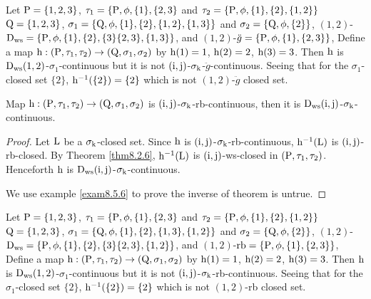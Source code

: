 \begin{exm}\label{exam8.5.5}
Let $\mathrm{P}=\{1,2,3\}$, $\tau_1 =\{\mathrm{P}, \phi, \{1\},\{2,3\}$ and $\tau_2 =\{\TSP, \phi, \{1\},\{2\},\break \{1,2\}\}$ $\mathrm{Q}=\{1,2,3\}$, $\sigma_{1} =\{\mathrm{Q},\phi,\{1\},\{2\},\{1,2\},\{1,3\}\}$ and $\sigma_{2} =\{\mathrm{Q},\phi, \{2\}\}$, $(1,2)$-$\mathrm{D}_{\mathrm{ws}} =\{\mathrm{P}, \phi, \{1\},\{2\},\{3\}\{2,3\},\{1,3\}\}$, and $(1,2)$-$\ddot{g} =\{\mathrm{P}, \phi, \{1\},\{2,3\}\}$, Define a map $\mathrm{h}: (\mathrm{P}, \tau_1, \tau_2 )\to (\mathrm{Q}, \sigma_{1}, \sigma_{2} )$ by $\mathrm{h}(1)=1$, $\mathrm{h}(2)=2$, $\mathrm{h}(3)=3$. Then $\mathrm{h}$ is $\mathrm{D}_{\mathrm{ws}} (1, 2)$-$\sigma_{1}$-continuous but it is not $(\mathrm{i}, \mathrm{j})$-$\sigma_{\mathrm{k}}$-$\ddot{g}$-continuous. Seeing that for the $\sigma_{1}$-closed set $\{2\}$, $\mathrm{h}^{-1} (\{2\})=\{2\}$ which is not $(1, 2)$-$\ddot{g}$ closed set.
\end{exm}

\begin{thm}\label{thm8.5.6}
Map $\mathrm{h}:(\mathrm{P}, \tau_1, \tau_2 )\to (\mathrm{Q}, \sigma_{1}, \sigma_{2} )$ is $(\mathrm{i}, \mathrm{j})$-$\sigma_{\mathrm{k}}$-rb-continuous, then it is $\mathrm{D}_{\mathrm{ws}} (\mathrm{i}, \mathrm{j})$-$\sigma_{\mathrm{k}}$-continuous.
\end{thm}

\begin{proof}
Let $\mathrm{L}$ be a $\sigma_{\mathrm{k}}$-closed set. Since $\mathrm{h}$ is $(\mathrm{i}, \mathrm{j})$-$\sigma_{\mathrm{k}}$-rb-continuous, $\mathrm{h}^{-1} (\mathrm{L})$ is $(\mathrm{i}, \mathrm{j})$-rb-closed. By Theorem \ref{thm8.2.6}, $\mathrm{h}^{-1} (\mathrm{L})$ is $(\mathrm{i}, \mathrm{j})$-ws-closed in $(\mathrm{P}, \tau_1, \tau_2 )$. Henceforth $\mathrm{h}$ is $\mathrm{D}_{\mathrm{ws}} (\mathrm{i}, \mathrm{j})$-$\sigma_{\mathrm{k}}$-continuous.

We use example \ref{exam8.5.6} to prove the inverse of theorem is untrue.
\end{proof}

\begin{exm}\label{exam8.5.6}
Let $\mathrm{P}=\{1,2,3\}$, $\tau_1 =\{\mathrm{P}, \phi, \{1\},\{2,3\}$ and $\tau_2 =\{\TSP, \phi, \{1\},\{2\},\break \{1,2\}\}$ $\mathrm{Q}=\{1,2,3\}$, $\sigma_{1} =\{\mathrm{Q}, \phi,\{1\},\{2\},\{1,3\},\{1,2\}\}$ and $\sigma_{2} =\{\mathrm{Q},\phi,\{2\}\}$, $(1,2)$-$\mathrm{D}_{\mathrm{ws}} =\{\mathrm{P}, \phi, \{1\},\{2\},\{3\}\{2,3\},\{1,2\}\}$, and $(1,2)$-$\mathrm{rb}=\{\mathrm{P}, \phi, \{1\},\{2,3\}\}$, Define a map $\mathrm{h}: (\mathrm{P}, \tau_1, \tau_2 )\to (\mathrm{Q}, \sigma_{1}, \sigma_{2} )$ by $\mathrm{h}(1)=1$, $\mathrm{h}(2)=2$, $\mathrm{h}(3)=3$. Then $\mathrm{h}$ is $\mathrm{D}_{\mathrm{ws}} (1, 2)$-$\sigma_{1}$-continuous but it is not $(\mathrm{i}, \mathrm{j})$-$\sigma_{\mathrm{k}}$-rb-continuous. Seeing that for the $\sigma_{1}$-closed set $\{2\}$, $\mathrm{h}^{-1} (\{2\})=\{2\}$ which is not $(1, 2)$-rb closed set.
\end{exm}

